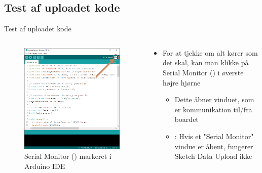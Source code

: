 \documentclass[aspectratio=169]{beamer}
\begin{document}
\subsection{Test af uploadet kode}
\begin{frame}{Test af uploadet kode}
\begin{columns}

	\begin{column}{0.5\textwidth}
		\begin{figure}
  			\includegraphics[height=0.6\textheight,keepaspectratio=true]{assets/pictures/serial-monitor.png}
  			\caption{Serial Monitor () markeret i Arduino IDE}
  			\label{fig:serial-monitor}
		\end{figure}
	\end{column}
	
	\begin{column}{0.5\textwidth}
		\begin{textBox}
			\begin{itemize}
				\item For at tjekke om alt kører som det skal, kan man klikke på Serial Monitor () i øverste højre hjørne
				\begin{itemize}
					\item Dette åbner  vinduet, som er kommunikation til/fra boardet
					\item {}: Hvis et "Serial Monitor" vindue er åbent, fungerer Sketch Data Upload ikke
				\end{itemize}
			\end{itemize}
		\end{textBox}
	\end{column}

\end{columns}
\end{frame}
\end{document}
